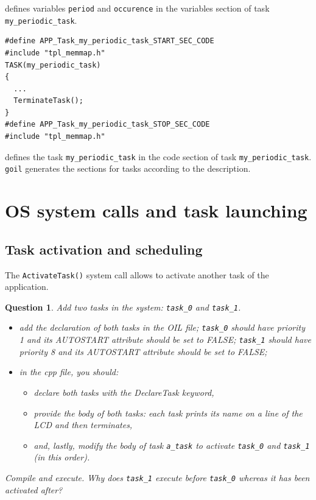 \documentclass[11pt]{report}
\newtheorem{ex}{Question}
\begin{document}
defines variables \lstinline{period} and \lstinline{occurence} in the variables section of task \lstinline{my_periodic_task}.

\begin{lstlisting}
#define APP_Task_my_periodic_task_START_SEC_CODE
#include "tpl_memmap.h"
TASK(my_periodic_task)
{
  ...
  TerminateTask();
}
#define APP_Task_my_periodic_task_STOP_SEC_CODE
#include "tpl_memmap.h"
\end{lstlisting}

defines the task \lstinline{my_periodic_task} in the code section of task \lstinline{my_periodic_task}. \lstinline{goil} generates the sections for tasks according to the description.


\section{OS system calls and task launching}

\subsection{Task activation and scheduling}

The \texttt{ActivateTask()} system call allows to activate another task of the application.

\begin{ex}
    Add two tasks in the system: \texttt{task_0} and \texttt{task_1}. 
    \begin{itemize}
        \item add the declaration of both tasks in the OIL file; \texttt{task_0} should have priority 1 and its AUTOSTART attribute should be set to FALSE; \texttt{task_1} should have priority 8 and its AUTOSTART attribute should be set to FALSE;
        \item in the cpp file, you should:
            \begin{itemize}
                \item declare both tasks with the DeclareTask keyword,
                \item provide the body of both tasks: each task prints its name on a line of the LCD and then terminates, 
                \item and, lastly, modify the body of task \texttt{a\_task} to activate \texttt{task_0} and \texttt{task\_1} (in this order). 
            \end{itemize}
    \end{itemize}
    Compile and execute. Why does \texttt{task_1} execute before \texttt{task_0} whereas it has been activated after?
\end{ex}
\end{document}
